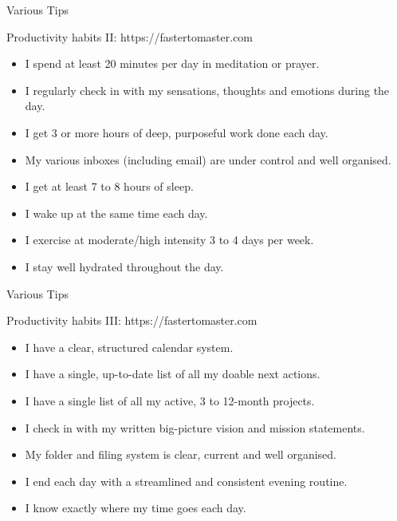 \begin{frame}{Various Tips}
  \begin{block}{Productivity habits II: https://fastertomaster.com}
    \begin{itemize}
      \item I spend at least 20 minutes per day in meditation or prayer.
      \item I regularly check in with my sensations, thoughts and emotions during the day.
      \item I get 3 or more hours of deep, purposeful work done each day.
      \item My various inboxes (including email) are under control and well organised.
      \item I get at least 7 to 8 hours of sleep.
      \item I wake up at the same time each day.
      \item I exercise at moderate/high intensity 3 to 4 days per week.
      \item I stay well hydrated throughout the day.
    \end{itemize}
  \end{block}
\end{frame}

\begin{frame}{Various Tips}
  \begin{block}{Productivity habits III: https://fastertomaster.com}
    \begin{itemize}
      \item I have a clear, structured calendar system.
      \item I have a single, up-to-date list of all my doable next actions.
      \item I have a single list of all my active, 3 to 12-month projects.
      \item I check in with my written big-picture vision and mission statements.
      \item My folder and filing system is clear, current and well organised.
      \item I end each day with a streamlined and consistent evening routine.
      \item I know exactly where my time goes each day.
    \end{itemize}
  \end{block}
\end{frame}

